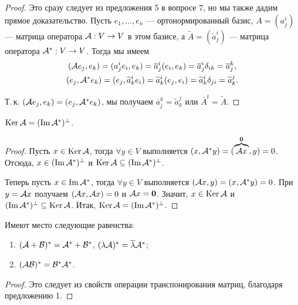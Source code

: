 \begin{proof}
    Это сразу следует из предложения 5 в вопросе 7, но мы также дадим прямое доказательство. Пусть $e_1, \ldots, e_n$ --- ортонормированный базис, $A = (a^i_j)$ --- матрица оператора $\mathcal{A}: V \to V$ в этом базисе, а $\widetilde{A} = (\widetilde{a}^i_j)$ --- матрица оператора $\mathcal{A}^\ast: V \to V$. Тогда мы имеем
    \begin{gather*}
        (\mathcal{A} e_j, e_k) = (a^i_je_i, e_k) = \overline{a}^i_j(e_i, e_k) = \overline{a}^i_j\delta_{ik} = \overline{a}^k_j,\\
        (e_j, \mathcal{A}^\ast e_k) = (e_j, \widetilde{a}^i_ke_i) = \widetilde{a}^i_k(e_j, e_i) = \widetilde{a}^i_k\delta_{ji} = \widetilde{a}^j_k.
    \end{gather*}

    Т.\,к. $(\mathcal{A} e_j, e_k) = (e_j, \mathcal{A}^\ast e_k)$, мы получаем $\overline{a}^k_j = \widetilde{a}^j_k$ или $\overline{A}^t = \widetilde{A}$.
\end{proof}

\begin{proposal}
    $\operatorname{Ker}\mathcal{A} = (\operatorname{Im}\mathcal{A}^\ast)^\perp$.
\end{proposal}

\begin{proof}
    Пусть $x \in \operatorname{Ker}\mathcal{A}$, тогда $\forall y \in V$ выполняется $(x, \mathcal{A}^\ast y) = (\overbrace{\mathcal{A} x}^{\boldsymbol{0}}, y) = 0$. Отсюда, $x \in (\operatorname{Im}\mathcal{A}^\ast)^\perp$ и $\operatorname{Ker}\mathcal{A} \subseteq (\operatorname{Im}\mathcal{A}^\ast)^\perp$.

    Теперь пусть $x \in \operatorname{Im}\mathcal{A}^\ast$, тогда $\forall y \in V$ выполняется $(\mathcal{A} x, y) = (x, \mathcal{A}^\ast y) = 0$. При $y = \mathcal{A} x$ получаем $(\mathcal{A} x, \mathcal{A} x) = 0$ и $\mathcal{A} x = \boldsymbol{0}$. Значит, $x \in \operatorname{Ker}\mathcal{A}$ и $(\operatorname{Im}\mathcal{A}^\ast)^\perp \subseteq \operatorname{Ker}\mathcal{A}$. Итак, $\operatorname{Ker}\mathcal{A} = (\operatorname{Im}\mathcal{A}^\ast)^\perp$.
\end{proof}

\begin{proposal}
    Имеют место следующие равенства:
    \begin{enumerate}[nolistsep]
        \item $(\mathcal{A} + \mathcal{B})^\ast = \mathcal{A}^\ast + \mathcal{B}^\ast$, $(\lambda\mathcal{A})^\ast = \overline{\lambda}\mathcal{A}^\ast$;
        \item $(\mathcal{A}\mathcal{B})^\ast = \mathcal{B}^\ast\mathcal{A}^\ast$.
    \end{enumerate}
\end{proposal}

\begin{proof}
    Это следует из свойств операции транспонирования матриц, благодаря предложению 1.
\end{proof}


